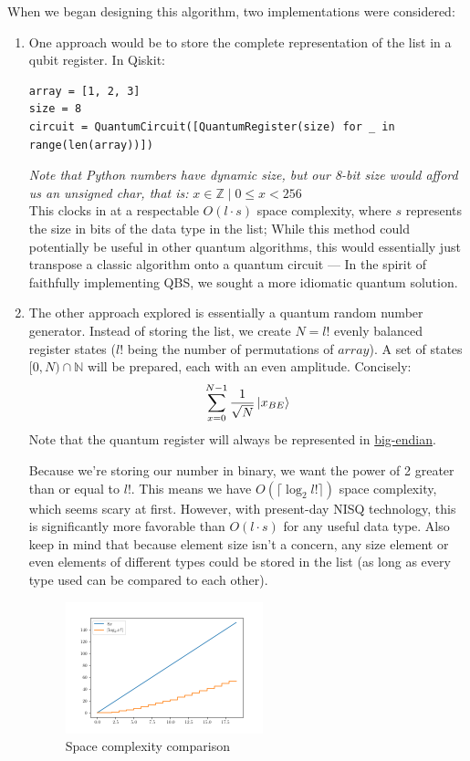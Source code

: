 \documentclass[12pt]{article}
\begin{document}
\noindent When we began designing this algorithm, two implementations were considered:
\begin{enumerate}
\item One approach would be to store the complete representation of the list in a qubit register. In Qiskit:
\begin{verbatim}
array = [1, 2, 3]
size = 8
circuit = QuantumCircuit([QuantumRegister(size) for _ in range(len(array))])
\end{verbatim}
\textit{Note that Python numbers have dynamic size, but our 8-bit size would afford us an unsigned char, that is:}
$ x \in \mathbb{Z} \mid 0 \leq x < 256 $ \\
This clocks in at a respectable $ O(l \cdot s) $ space complexity, where $ s $ represents the size in bits of the data type in the list; While this method could potentially be useful in other quantum algorithms, this would essentially just transpose a classic algorithm onto a quantum circuit --- In the spirit of faithfully implementing QBS, we sought a more idiomatic quantum solution.
 
\item The other approach explored is essentially a quantum random number generator. Instead of storing the list, we create $ N = l! $ evenly balanced register states ($l!$ being the number of permutations of $array$). A set of states $ [0, N) \cap \mathbb{N} $ will be prepared, each with an even amplitude. Concisely:
    $$ \sum_{x=0}^{N-1} \frac{1}{\sqrt{N}} \ket{x_{BE}} $$
Note that the quantum register will always be represented in \href{https://en.wikipedia.org/wiki/Endianness}{big-endian}.

Because we're storing our number in binary, we want the power of 2 greater than or equal to $ l! $. This means we have $ O(\lceil \log_2 l! \rceil) $ space complexity, which seems scary at first. However, with present-day NISQ technology, this is significantly more favorable than $ O(l \cdot s) $ for any useful data type. Also keep in mind that because element size isn't a concern, any size element or even elements of different types could be stored in the list (as long as every type used can be compared to each other).

\begin{figure}[h]
    \centering
    \includegraphics[width=0.54\textwidth]{images/size_compare.png}
    \caption{Space complexity comparison}
    \label{fig:chart1}
\end{figure}


\end{enumerate}
\end{document}
